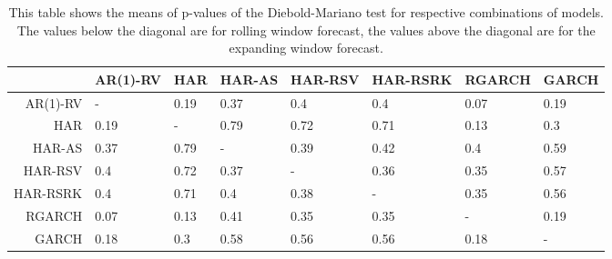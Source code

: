 \begin{table}[ht]
\centering
\begin{tabular}{rlllllll}
  \hline
 & AR(1)-RV & HAR & HAR-AS & HAR-RSV & HAR-RSRK & RGARCH & GARCH \\ 
  \hline
AR(1)-RV & - & 0.19 & 0.37 & 0.4 & 0.4 & 0.07 & 0.19 \\ 
  HAR & 0.19 & - & 0.79 & 0.72 & 0.71 & 0.13 & 0.3 \\ 
  HAR-AS & 0.37 & 0.79 & - & 0.39 & 0.42 & 0.4 & 0.59 \\ 
  HAR-RSV & 0.4 & 0.72 & 0.37 & - & 0.36 & 0.35 & 0.57 \\ 
  HAR-RSRK & 0.4 & 0.71 & 0.4 & 0.38 & - & 0.35 & 0.56 \\ 
  RGARCH & 0.07 & 0.13 & 0.41 & 0.35 & 0.35 & - & 0.19 \\ 
  GARCH & 0.18 & 0.3 & 0.58 & 0.56 & 0.56 & 0.18 & - \\ 
   \hline
\end{tabular}
\caption[DM test means]{This table shows the means of p-values of the Diebold-Mariano test for respective combinations of models.
                The values below the diagonal are for rolling window forecast, the values above the diagonal are for the expanding window forecast.} 
\label{Table:DM_test_mean}
\end{table}
